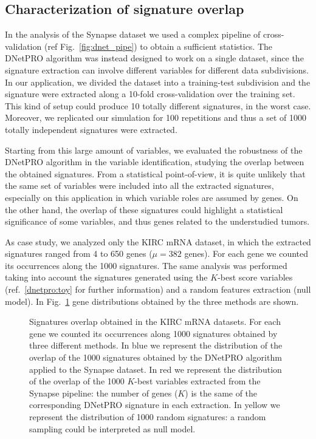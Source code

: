 \documentclass{standalone}
\begin{document}
\subsection[Signature Overlap]{Characterization of signature overlap}\label{synapse:overlap}

In the analysis of the Synapse dataset we used a complex pipeline of cross-validation (ref Fig.~\ref{fig:dnet_pipe}) to obtain a sufficient statistics.
The \textsf{DNetPRO} algorithm was instead designed to work on a single dataset, since the signature extraction can involve different variables for different data subdivisions.
In our application, we divided the dataset into a training-test subdivision and the signature were extracted along a 10-fold cross-validation over the training set.
This kind of setup could produce 10 totally different signatures, in the worst case.
Moreover, we replicated our simulation for 100 repetitions and thus a set of 1000 totally independent signatures were extracted.

Starting from this large amount of variables, we evaluated the robustness of the \textsf{DNetPRO} algorithm in the variable identification, studying the overlap between the obtained signatures.
From a statistical point-of-view, it is quite unlikely that the same set of variables were included into all the extracted signatures, especially on this application in which variable roles are assumed by genes.
On the other hand, the overlap of these signatures could highlight a statistical significance of some variables, and thus genes related to the understudied tumors.

As case study, we analyzed only the KIRC mRNA dataset, in which the extracted signatures ranged from 4 to 650 genes ($\mu=382$ genes).
For each gene we counted its occurrences along the 1000 signatures.
The same analysis was performed taking into account the signatures generated using the $K$-best score variables (ref.~\ref{dnetpro:toy} for further information) and a random features extraction (null model).
In Fig.~\ref{fig:overlap} gene distributions obtained by the three methods are shown.

\begin{figure}[htbp]
\centering
\def\svgwidth{0.6\textwidth}

\caption{Signatures overlap obtained in the KIRC mRNA datasets.
For each gene we counted its occurrences along 1000 signatures obtained by three different methods.
In blue we represent the distribution of the overlap of the 1000 signatures obtained by the \textsf{DNetPRO} algorithm  applied to the Synapse dataset.
In red we represent the distribution of the overlap of the 1000 $K$-best variables extracted from the Synapse pipeline: the number of genes ($K$) is the same of the corresponding \textsf{DNetPRO} signature in each extraction.
In yellow we represent the distribution of 1000 random signatures: a random sampling could be interpreted as null model.
}
\label{fig:overlap}
\end{figure}
\end{document}
